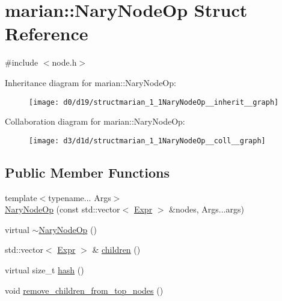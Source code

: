 \hypertarget{structmarian_1_1NaryNodeOp}{}\section{marian\+:\+:Nary\+Node\+Op Struct Reference}
\label{structmarian_1_1NaryNodeOp}


{\ttfamily \#include $<$node.\+h$>$}



Inheritance diagram for marian\+:\+:Nary\+Node\+Op\+:
\nopagebreak
\begin{figure}[H]
\begin{center}
\leavevmode
\texttt{[image: d0/d19/structmarian\_1\_1NaryNodeOp\_\_inherit\_\_graph]}
\end{center}
\end{figure}


Collaboration diagram for marian\+:\+:Nary\+Node\+Op\+:
\nopagebreak
\begin{figure}[H]
\begin{center}
\leavevmode
\texttt{[image: d3/d1d/structmarian\_1\_1NaryNodeOp\_\_coll\_\_graph]}
\end{center}
\end{figure}
\subsection*{Public Member Functions}
\begin{DoxyCompactItemize}
\item 
{\footnotesize template$<$typename... Args$>$ }\\\hyperlink{structmarian_1_1NaryNodeOp_aed8f74da7153fd55707ea8cd1456058b}{Nary\+Node\+Op} (const std\+::vector$<$ \hyperlink{namespacemarian_a498d8baf75b754011078b890b39c8e12}{Expr} $>$ \&nodes, Args...\+args)
\item 
virtual \hyperlink{structmarian_1_1NaryNodeOp_a91a3a2f5e7e91d4966698b7bc443d63b}{$\sim$\+Nary\+Node\+Op} ()
\item 
std\+::vector$<$ \hyperlink{namespacemarian_a498d8baf75b754011078b890b39c8e12}{Expr} $>$ \& \hyperlink{structmarian_1_1NaryNodeOp_a594b5e543321e738a365eecab5db0638}{children} ()
\item 
virtual size\+\_\+t \hyperlink{structmarian_1_1NaryNodeOp_ab1b6a692080382203afe5ceaf0c4279d}{hash} ()
\item 
void \hyperlink{structmarian_1_1NaryNodeOp_ae01b13621696a89e290a6e6c7e5c668a}{remove\+\_\+children\+\_\+from\+\_\+top\+\_\+nodes} ()
\end{DoxyCompactItemize}
